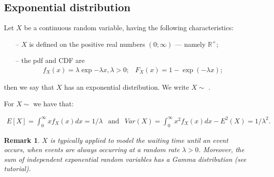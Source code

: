 \documentclass[smaller]{beamer}\usepackage[]{graphicx}\usepackage[]{color}
\newtheorem{remark}{Remark}[section]
\newcommand{\bea}{\begin{eqnarray}}
\newcommand{\eea}{\end{eqnarray}}
\newcommand{\nn}{\nonumber}
\begin{document}
\subsection{Exponential distribution}

\begin{frame}{\subsecname}
  \begin{definition}
  Let $X$ be a  continuous random variable, having the following  characteristics:
  \begin{itemize}
  \item[--]       $X$ is defined on the positive real numbers $\left( 0;\infty \right) $ --- namely $\mathbb{R}^+$;
  \item[--]       the pdf and CDF are
  \bea
  f_X(x)=\lambda \exp{ -\lambda x},\lambda
  >0; &
  F_X(x)=1-\exp (-\lambda x); \nn \eea
  \end{itemize}
  then we say that $X$ has an exponential distribution. We write $X\sim$ .
  \end{definition}

  For $X\sim$  we have that:
  \begin{small}
  \bea
  E[X]=\int_{0}^{\infty }xf_X(x )dx= 1/\lambda & \text{and} &   Var(X)=\int_{0}^{\infty }x^{2}f_X(x )dx-E^{2}(X)=1/\lambda ^{2}. \nn
  \eea
  \end{small}

  \begin{remark}
  $X$ is typically applied to model the waiting time until an event occurs, when events are always occurring at a random rate $\lambda >0$. Moreover, the sum of independent exponential random variables has a Gamma distribution (see tutorial).
  \end{remark}
\end{frame}
\end{document}

